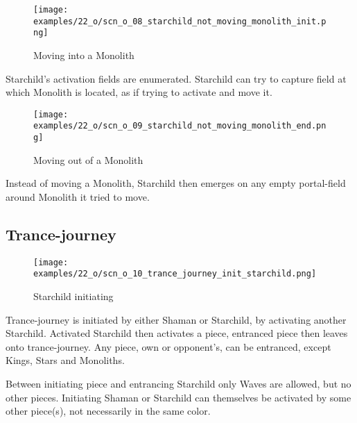 \vspace*{-0.9\baselineskip}
\noindent
\begin{wrapfigure}[5]{l}{0.4\textwidth}
\centering
\texttt{[image: examples/22\_o/scn\_o\_08\_starchild\_not\_moving\_monolith\_init.png]}
\caption{Moving into a Monolith}
\label{fig:scn_o_08_starchild_not_moving_monolith_init}
\end{wrapfigure}
Starchild’s activation fields are enumerated. Starchild can try to capture field at which
Monolith is located, as if trying to activate and move it.

\vspace*{2.1\baselineskip}
\noindent
\begin{wrapfigure}[4]{l}{0.4\textwidth}
\centering
\texttt{[image: examples/22\_o/scn\_o\_09\_starchild\_not\_moving\_monolith\_end.png]}
\caption{Moving out of a Monolith}
\label{fig:scn_o_09_starchild_not_moving_monolith_end}
\end{wrapfigure}
Instead of moving a Monolith, Starchild then emerges on any empty portal-field around Monolith
it tried to move.

\clearpage %

\subsection*{Trance-journey}

\vspace*{-0.9\baselineskip}
\noindent
\begin{wrapfigure}[11]{l}{0.4\textwidth}
\centering
\texttt{[image: examples/22\_o/scn\_o\_10\_trance\_journey\_init\_starchild.png]}
\caption{Starchild initiating}
\label{fig:scn_o_10_trance_journey_init_starchild}
\end{wrapfigure}
Trance-journey is initiated by either Shaman or Starchild, by activating another Starchild.
Activated Starchild then activates a piece, entranced piece then leaves onto trance-journey.
Any piece, own or opponent's, can be entranced, except Kings, Stars and Monoliths.

Between initiating piece and entrancing Starchild only Waves are allowed, but no other pieces.
Initiating Shaman or Starchild can themselves be activated by some other piece(s), not necessarily
in the same color.

